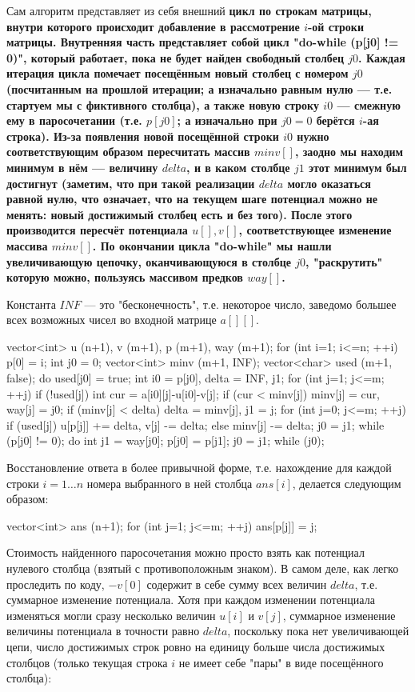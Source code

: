 Сам алгоритм представляет из себя внешний \bf{цикл по строкам матрицы}, внутри которого происходит добавление в рассмотрение $i$-ой строки матрицы. Внутренняя часть представляет собой цикл "do-while (p[j0] != 0)", который работает, пока не будет найден свободный столбец $j0$. Каждая итерация цикла помечает посещённым новый столбец с номером $j0$ (посчитанным на прошлой итерации; а изначально равным нулю --- т.е. стартуем мы с фиктивного столбца), а также новую строку $i0$ --- смежную ему в паросочетании (т.е. $p[j0]$; а изначально при $j0=0$ берётся $i$-ая строка). Из-за появления новой посещённой строки $i0$ нужно соответствующим образом пересчитать массив $minv[]$, заодно мы находим минимум в нём --- величину $delta$, и в каком столбце $j1$ этот минимум был достигнут (заметим, что при такой реализации $delta$ могло оказаться равной нулю, что означает, что на текущем шаге потенциал можно не менять: новый достижимый столбец есть и без того). После этого производится пересчёт потенциала $u[], v[]$, соответствующее изменение массива $minv[]$. По окончании цикла "do-while" мы нашли увеличивающую цепочку, оканчивающуюся в столбце $j0$, "раскрутить" которую можно, пользуясь массивом предков $way[]$.

Константа $INF$ --- это "бесконечность", т.е. некоторое число, заведомо большее всех возможных чисел во входной матрице $a[][]$.

\code
vector<int> u (n+1), v (m+1), p (m+1), way (m+1);
for (int i=1; i<=n; ++i) {
	p[0] = i;
	int j0 = 0;
	vector<int> minv (m+1, INF);
	vector<char> used (m+1, false);
	do {
		used[j0] = true;
		int i0 = p[j0],  delta = INF,  j1;
		for (int j=1; j<=m; ++j)
			if (!used[j]) {
				int cur = a[i0][j]-u[i0]-v[j];
				if (cur < minv[j])
					minv[j] = cur,  way[j] = j0;
				if (minv[j] < delta)
					delta = minv[j],  j1 = j;
			}
		for (int j=0; j<=m; ++j)
			if (used[j])
				u[p[j]] += delta,  v[j] -= delta;
			else
				minv[j] -= delta;
		j0 = j1;
	} while (p[j0] != 0);
	do {
		int j1 = way[j0];
		p[j0] = p[j1];
		j0 = j1;
	} while (j0);
}
\endcode

Восстановление ответа в более привычной форме, т.е. нахождение для каждой строки $i = 1 \ldots n$ номера выбранного в ней столбца $ans[i]$, делается следующим образом:

\code
vector<int> ans (n+1);
for (int j=1; j<=m; ++j)
	ans[p[j]] = j;
\endcode

Стоимость найденного паросочетания можно просто взять как потенциал нулевого столбца (взятый с противоположным знаком). В самом деле, как легко проследить по коду, $-v[0]$ содержит в себе сумму всех величин $delta$, т.е. суммарное изменение потенциала. Хотя при каждом изменении потенциала изменяться могли сразу несколько величин $u[i]$ и $v[j]$, суммарное изменение величины потенциала в точности равно $delta$, поскольку пока нет увеличивающей цепи, число достижимых строк ровно на единицу больше числа достижимых столбцов (только текущая строка $i$ не имеет себе "пары" в виде посещённого столбца):

